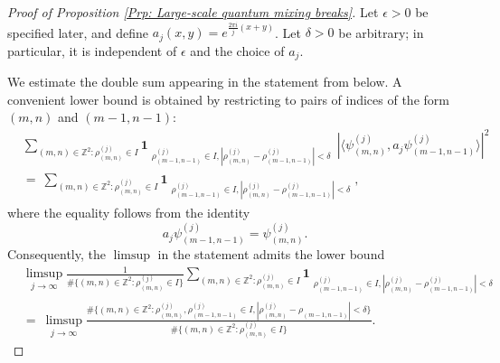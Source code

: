 \documentclass[11pt,twoside,reqno]{amsart} \usepackage{a4wide} \usepackage[T1]{fontenc} \usepackage[utf8]{inputenc} \usepackage{soul}  \usepackage{amsmath} \usepackage{amsfonts} \usepackage{amssymb} \usepackage{mathtools} \usepackage{amsthm} \usepackage{xcolor} \usepackage{graphicx} \usepackage{hyperref} \usepackage{standalone} \usepackage{esint} \usepackage{comment} \usepackage[left=2.3cm,top=3cm,right=2.3cm]{geometry} \usepackage{bm} \usepackage{svg} \usepackage{float} \numberwithin{equation}{section} \theoremstyle{plain} \newtheorem{thm}{Theorem}[section] \newtheorem{theorem}[thm]{Theorem} \newtheorem*{theorem*}{Theorem}\newtheorem{conj}[thm]{Conjecture} \newtheorem{lemma}[thm]{Lemma} \newtheorem{prop}[thm]{Proposition} \newtheorem{proposition}[thm]{Proposition} \newtheorem{cor}[thm]{Corollary} \newtheorem{question}[thm]{Question} \newtheorem{corollary}[thm]{Corollary} \newtheorem{assumption}[thm]{Assumption} \theoremstyle{definition} \newtheorem{defn}[thm]{Definition} \newtheorem{choice}[thm]{Choice} \newtheorem{definition}[thm]{Definition} \newtheorem{ex}[thm]{Example} \newtheorem{notation}[thm]{Notation} \newtheorem*{ack}{Acknowledgements} \theoremstyle{remark} \newtheorem{remark}[thm]{Remark} \newtheorem{bigremark}[thm]{Remark} \usepackage{xcolor} \newcommand{\red}[1]{ {\color{Red}#1} } \newcommand{\blue}[1]{ {\color{Blue}#1} } \author{Kai Hippi} \address{Aalto University, Espoo, Finland} \email{kai.hippi@aalto.fi}
\begin{document}
\begin{proof}[Proof of Proposition \ref{Prp: Large-scale quantum mixing breaks}]
	
	Let $ \epsilon > 0 $ be specified later, and define $ a_{j}( x,y ) = e^{ \frac{2 \pi i}{j}( x + y ) } $. Let $ \delta > 0 $ be arbitrary; in particular, it is independent of $ \epsilon $ and the choice of $ a_{j} $.

	We estimate the double sum appearing in the statement from below. A convenient lower bound is obtained by restricting to pairs of indices of the form $ (m,n) $ and $ (m-1,n-1) $:
	\begin{align*}
		&
		\sum_{ ( m,n ) \in \mathbb{Z}^{2} : \rho_{( m,n )}^{( j )} \in I }^{} \boldsymbol 1_{ \substack{ \rho_{( m-1,n-1 )}^{( j )} \in I,  | \rho_{( m,n )}^{(j)} - \rho_{( m-1,n-1 )}^{( j )} | < \delta } } \, | \langle \psi_{( m,n )}^{( j )}, a_{j} \psi^{( j )}_{( m-1,n-1 )} \rangle |^{2}
		\\
		& = \
		\sum_{ ( m,n ) \in \mathbb{Z}^{2} : \rho_{( m,n )}^{( j )} \in I }^{} \boldsymbol 1_{ \substack{ \rho_{( m-1,n-1 )}^{( j )} \in I,  | \rho_{( m,n )}^{(j)} - \rho_{( m-1,n-1 )}^{( j )} | < \delta } },
	\end{align*}
	where the equality follows from the identity
	$$ a_{j} \psi_{( m-1, n-1 )}^{( j )} = \psi_{( m,n )}^{( j )}. $$
Consequently, the $\limsup$ in the statement admits the lower bound
	\begin{align*}
		&
		\limsup_{ j \to \infty } \frac{1}{ \# \{ ( m,n ) \in \mathbb{Z}^{2} : \rho_{( m,n )}^{( j )} \in I \} } \sum_{ ( m,n ) \in \mathbb{Z}^{2} : \rho_{( m,n )}^{( j )} \in I }^{} \boldsymbol 1_{ \substack{ \rho_{( m-1,n-1 )}^{( j )} \in I,  | \rho_{( m,n )}^{(j)} - \rho_{( m-1,n-1 )}^{( j )} | < \delta } }
		\\
		& = \
		\limsup_{ j \to \infty } \frac{ \# \{ ( m,n ) \in \mathbb{Z}^{2} : \rho_{( m,n )}^{( j )}, \rho_{( m-1,n-1 )}^{( j )} \in I, | \rho_{( m,n )}^{( j )} - \rho_{( m-1,n-1 )} | < \delta \} }{ \# \{ ( m,n ) \in \mathbb{Z}^{2} : \rho_{( m,n )}^{( j )} \in I \} }.
	\end{align*}


\end{proof}
\end{document}
